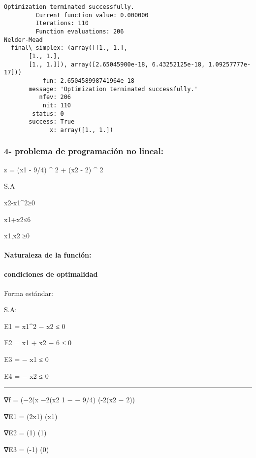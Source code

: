 \documentclass[11pt]{article}
\begin{document}
    \begin{Verbatim}[commandchars=\\\{\}]
Optimization terminated successfully.
         Current function value: 0.000000
         Iterations: 110
         Function evaluations: 206
Nelder-Mead
  final\_simplex: (array([[1., 1.],
       [1., 1.],
       [1., 1.]]), array([2.65045900e-18, 6.43252125e-18, 1.09257777e-17]))
           fun: 2.650458998741964e-18
       message: 'Optimization terminated successfully.'
          nfev: 206
           nit: 110
        status: 0
       success: True
             x: array([1., 1.])

    \end{Verbatim}

    \subsubsection{4- problema de programación no
lineal:}\label{problema-de-programaciuxf3n-no-lineal}

z = (x1 - 9/4) \^{} 2 + (x2 - 2) \^{} 2

S.A

x2-x1\^{}2≥0

x1+x2≤6

x1,x2 ≥0

\paragraph{Naturaleza de la función:}\label{naturaleza-de-la-funciuxf3n}

\paragraph{condiciones de optimalidad}\label{condiciones-de-optimalidad}

Forma estándar:

S.A:

E1 = x1\^{}2 − x2 ≤ 0

E2 = x1 + x2 − 6 ≤ 0

E3 = − x1 ≤ 0

E4 = − x2 ≤ 0

\begin{center}\rule{0.5\linewidth}{\linethickness}\end{center}

∇f = (−2(x −2(x2 1 − − 9/4) (-2(x2 − 2))

∇E1 = (2x1) (x1)

∇E2 = (1) (1)

∇E3 = (-1) (0)
\end{document}
